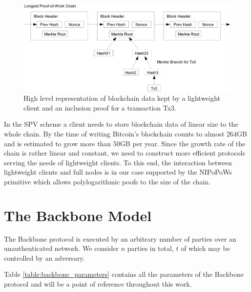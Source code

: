 \begin{figure}[h!]
	\begin{center}
		\includegraphics[scale=0.3]{figures/SPV_nakamoto.png}
	\end{center}
	\caption{High level representation of blockchain data kept by a lightweight client
	 and an inclusion proof for a transaction Tx3.\cite{nakamoto}}
	\label{fig:SPV_nakamoto}
\end{figure}

In the SPV scheme a client needs to store blockchain data of linear size to the whole chain. By
the time of writing Bitcoin's blockchain counts to almost 264GB and is estimated to grow more
than 50GB per year.  Since the growth rate of the chain is rather linear and constant, we need
to construct more efficient protocols serving the needs of lightweight clients. To this end,
the interaction between lightweight clients and full nodes is in our case supported  by the
NIPoPoWs\cite{nipopows} primitive which allows polylogarithmic poofs to the size of the chain.

\section{The Backbone Model}
The Backbone protocol is executed by an arbitrary number of parties over an unauthenticated network.
We consider $n$ parties in total, $t$ of which may be controlled by an adversary.

Table \ref{table:backbone_parameters} contains all the parameters of the Backbone protocol and will
be a point of reference throughout this work.

